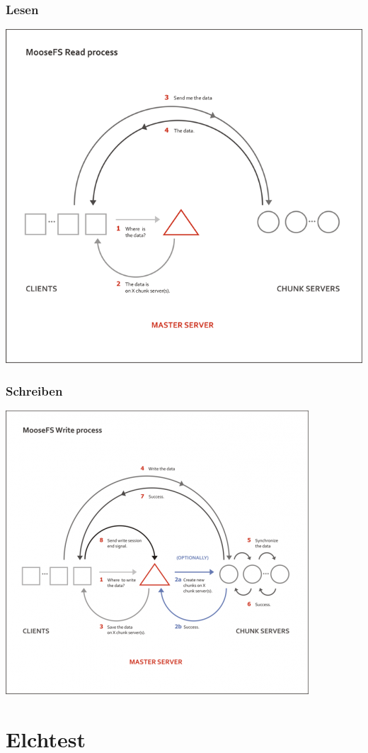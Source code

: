 \documentclass{beamer}
\begin{document}
\begin{frame}
	\frametitle{Lesen}
	\centering
	\includegraphics[scale=0.3]{read.png}
\end{frame}

\begin{frame}
	\frametitle{Schreiben}
	\centering
	\includegraphics[scale=0.3]{write.png}
\end{frame}


\section{Elchtest}
\end{document}
